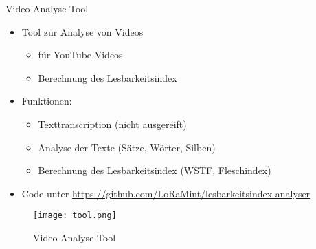 \documentclass[
	aspectratio=169, %
	8pt, %
]{beamer}
\begin{document}
\begin{frame}{}
	\begin{mycolumns}
		
		\begin{definition}{Video-Analyse-Tool}
			\begin{itemize}
				\item Tool zur Analyse von Videos
				\begin{itemize}
					\item für YouTube-Videos
					\item Berechnung des Lesbarkeitsindex
				\end{itemize}
				\item Funktionen:
				\begin{itemize}
					\item Texttranscription (nicht ausgereift)
					\item Analyse der Texte (Sätze, Wörter, Silben)
					\item Berechnung des Lesbarkeitsindex (WSTF, Fleschindex)
				\end{itemize}
				\item Code unter \url{https://github.com/LoRaMint/lesbarkeitsindex-analyser}
			\end{itemize}
		\end{definition}

		\mynextcolumn

		\begin{figure}
			\centering
			\texttt{[image: tool.png]}
			\caption{Video-Analyse-Tool} 
		\end{figure}

	\end{mycolumns}
\end{frame}
\end{document}
